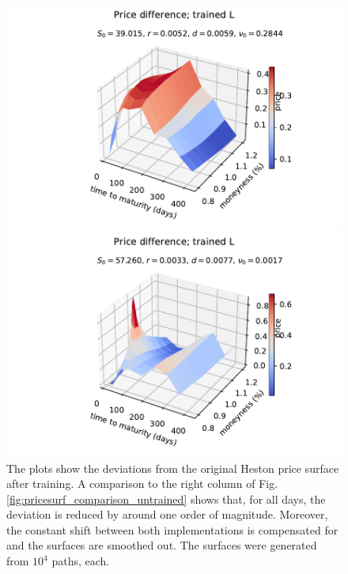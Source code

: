\documentclass[
a4paper,     %
12pt           %
]{scrartcl}  %
\numberwithin{equation}{section}
\begin{document}
\begin{figure}
\begin{minipage}{0.49\textwidth}
\end{minipage}
\begin{minipage}{0.49\textwidth}
	\includegraphics[width=\textwidth]{fig/Psurf_trained_diff_2017-01-04_rec_3lay_seed1}
\end{minipage}
\begin{minipage}{0.49\textwidth}
	\includegraphics[width=\textwidth]{fig/Psurf_trained_diff_2017-01-05_rec_3lay_seed1}
\end{minipage}
\caption{The plots show the deviations from the original Heston price surface after training. A comparison to the right column of Fig. \ref{fig:pricesurf_comparison_untrained} shows that, for all days, the deviation is reduced by around one order of magnitude. Moreover, the constant shift between both implementations is compensated for and the surfaces are smoothed out. The surfaces were generated from $10^4$ paths, each.}
\label{fig:pricesurf_comparison_trained}
\end{figure}
\end{document}
